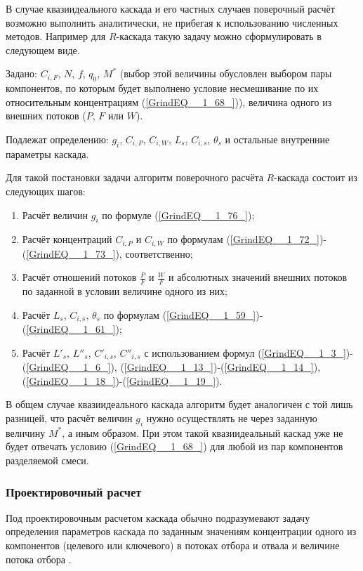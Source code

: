 В случае квазиидеального каскада и его частных случаев поверочный расчёт возможно выполнить аналитически, не прибегая к использованию численных методов. Например для $R$-каскада такую задачу можно сформулировать в следующем виде.

Задано: $C_{i,F}$, $N$, $f$, $q_0$, $M^{*}$ (выбор этой величины обусловлен выбором пары компонентов, по которым будет выполнено условие несмешивание по их относительным концентрациям (\ref{GrindEQ__1_68_})), величина одного из внешних потоков ($P$, $F$ или $W$).

Подлежат определению: $g_i$, $C_{i,P}$, $C_{i,W}$, $L_{s}$, $C_{i, s}$, $\theta_{s}$ и остальные внутренние параметры каскада.  

Для такой постановки задачи алгоритм поверочного расчёта $R$-каскада состоит из следующих шагов:

\begin{enumerate}
  \item Расчёт величин $g_i$ по формуле (\ref{GrindEQ__1_76_});
  \item Расчёт концентраций $C_{i,P}$ и $C_{i,W}$ по формулам (\ref{GrindEQ__1_72_})-(\ref{GrindEQ__1_73_}), соответственно;
  \item Расчёт отношений потоков  $\frac{P}{F}$ и $\frac{W}{F}$ и абсолютных значений внешних потоков по заданной в условии величине одного из них; 
  \item Расчёт $L_{s}$, $C_{i, s}$, $\theta_{s}$ по формулам (\ref{GrindEQ__1_59_})-(\ref{GrindEQ__1_61_});
  \item Расчёт ${L'}_{s}$, ${L''}_{s}$, $C'_{i, s} $, $C''_{i, s}$ с использованием формул (\ref{GrindEQ__1_3_})-(\ref{GrindEQ__1_6_}), (\ref{GrindEQ__1_13_})-(\ref{GrindEQ__1_14_}), (\ref{GrindEQ__1_18_})-(\ref{GrindEQ__1_19_}).
\end{enumerate}

В общем случае квазиидеального каскада алгоритм будет аналогичен с той лишь разницей, что расчёт величин $g_i$ нужно осуществлять не через заданную величину $M^{*}$, а иным образом. При этом такой квазиидеальный каскад уже не будет отвечать условию (\ref{GrindEQ__1_68_}) для любой из пар компонентов разделяемой смеси. 

\subsubsection{Проектировочный расчет}
Под проектировочным расчетом каскада обычно подразумевают задачу определения параметров каскада по заданным значениям концентрации одного из компонентов (целевого или ключевого) в потоках отбора и отвала и величине потока отбора \cite{sulaberidzeTeoriyaKaskadovDlya2011}.

